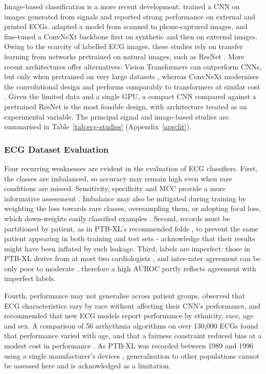 \documentclass[12pt,nonacm,acmlarge,titlepage,screen]{acmart}
\begin{document}
Image-based classification is a more recent development. \citet{sangha_automated_2022} trained a CNN on images generated from signals and reported strong performance on external and printed ECGs. \citet{gliner_domain_2023} adapted a model from scanned to phone-captured images, and \citet{wang_pipeline_2025} fine-tuned a ConvNeXt backbone first on synthetic and then on external images. Owing to the scarcity of labelled ECG images, these studies rely on transfer learning from networks pretrained on natural images, such as ResNet \cite{he_deep_2016,yosinski_transfer_2014}. More recent architectures offer alternatives: Vision Transformers can outperform CNNs, but only when pretrained on very large datasets \cite{dosovitskiy_image_2021}, whereas ConvNeXt modernises the convolutional design and performs comparably to transformers at similar cost \cite{liu_convnet_2022}. Given the limited data and a single GPU, a compact CNN compared against a pretrained ResNet is the most feasible design, with architecture treated as an experimental variable. The principal signal and image-based studies are summarised in Table~\ref{tab:ecg-studies} (Appendix~\ref{app:lit}).

\subsubsection{ECG Dataset Evaluation}
\label{sec:ml-eval}

Four recurring weaknesses are evident in the evaluation of ECG classifiers. First, the classes are imbalanced, so accuracy may remain high even when rare conditions are missed. Sensitivity, specificity and MCC provide a more informative assessment \cite{chicco_advantages_2020}. Imbalance may also be mitigated during training by weighting the loss towards rare classes, oversampling them, or adopting focal loss, which down-weights easily classified examples \cite{lin_focal_2017}. Second, records must be partitioned by patient, as in PTB-XL's recommended folds \cite{wagner_ptbxl_2020}, to prevent the same patient appearing in both training and test sets - \citet{wang_pipeline_2025} acknowledge that their results might have been inflated by such leakage. Third, labels are imperfect: those in PTB-XL derive from at most two cardiologists \cite{wagner_ptbxl_2020}, and inter-rater agreement can be only poor to moderate \cite{dhutia_interrater_2017}, therefore a high AUROC partly reflects agreement with imperfect labels.

Fourth, performance may not generalise across patient groups. \citet{noseworthy_assessing_2020} observed that ECG characteristics vary by race without affecting their CNN's performance, and recommended that new ECG models report performance by ethnicity, race, age and sex. A comparison of 56 arrhythmia algorithms on over 130,000 ECGs found that performance varied with age, and that a fairness constraint reduced bias at a modest cost in performance \cite{perez_alday_age_2022}. As PTB-XL was recorded between 1989 and 1996 using a single manufacturer's devices \cite{wagner_ptbxl_2020}, generalisation to other populations cannot be assessed here and is acknowledged as a limitation.
\end{document}
